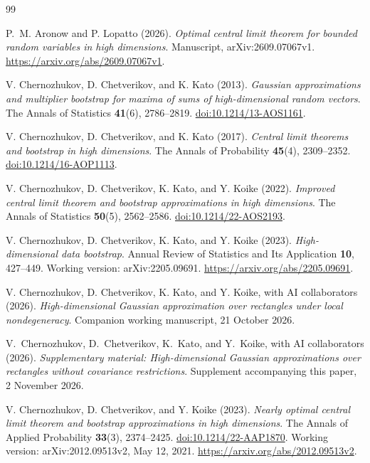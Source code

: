\documentclass[11pt,letterpaper]{article}
\theoremstyle{remark}
\begin{document}
\begin{thebibliography}{99}
\setlength{\itemsep}{1pt}
{}
P.~M. Aronow and P. Lopatto (2026).
\emph{Optimal central limit theorem for bounded random variables in high dimensions}.
Manuscript, arXiv:2609.07067v1.
\url{https://arxiv.org/abs/2609.07067v1}.

V. Chernozhukov, D. Chetverikov, and K. Kato (2013).
\emph{Gaussian approximations and multiplier bootstrap for maxima of
sums of high-dimensional random vectors}.
The Annals of Statistics \textbf{41}(6), 2786--2819.
\href{https://doi.org/10.1214/13-AOS1161}{doi:10.1214/13-AOS1161}.

V. Chernozhukov, D. Chetverikov, and K. Kato (2017).
\emph{Central limit theorems and bootstrap in high dimensions}.
The Annals of Probability \textbf{45}(4), 2309--2352.
\href{https://doi.org/10.1214/16-AOP1113}{doi:10.1214/16-AOP1113}.

V. Chernozhukov, D. Chetverikov, K. Kato, and Y. Koike (2022).
\emph{Improved central limit theorem and bootstrap approximations in
high dimensions}. The Annals of Statistics \textbf{50}(5), 2562--2586.
\href{https://doi.org/10.1214/22-AOS2193}{doi:10.1214/22-AOS2193}.

V. Chernozhukov, D. Chetverikov, K. Kato, and Y. Koike (2023).
\emph{High-dimensional data bootstrap}.
Annual Review of Statistics and Its Application \textbf{10}, 427--449.
Working version: arXiv:2205.09691.
\url{https://arxiv.org/abs/2205.09691}.

V. Chernozhukov, D. Chetverikov, K. Kato, and Y. Koike,
with AI collaborators (2026).
\emph{High-dimensional Gaussian approximation over rectangles under
local nondegeneracy}. Companion working manuscript, 21 October 2026.

V.~Chernozhukov, D.~Chetverikov, K.~Kato, and Y.~Koike,
with AI collaborators (2026).
\emph{Supplementary material: High-dimensional Gaussian approximations
over rectangles without covariance restrictions}.
Supplement accompanying this paper, 2 November 2026.

V. Chernozhukov, D. Chetverikov, and Y. Koike (2023).
\emph{Nearly optimal central limit theorem and bootstrap approximations
in high dimensions}.
The Annals of Applied Probability \textbf{33}(3), 2374--2425.
\href{https://doi.org/10.1214/22-AAP1870}{doi:10.1214/22-AAP1870}.
Working version: arXiv:2012.09513v2, May 12, 2021.
\url{https://arxiv.org/abs/2012.09513v2}.


\end{thebibliography}
\end{document}

